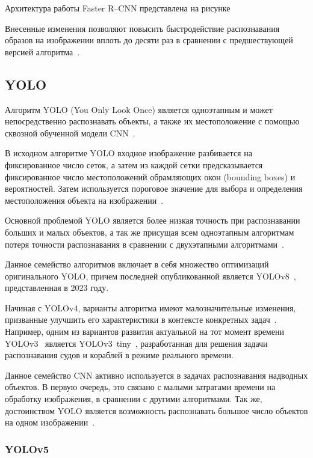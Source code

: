 Архитектура работы Faster R–CNN представлена на рисунке


Внесенные изменения позволяют повысить быстродействие распознавания образов на изображении вплоть до десяти раз в сравнении с предшествующей версией алгоритма~\cite{faster-r-cnn}.

\subsection{YOLO}

Алгоритм YOLO (You Only Look Once) является одноэтапным и может непосредственно распознавать объекты, а также их местоположение с помощью сквозной обученной модели CNN~\cite{yolo-review}.

В исходном алгоритме YOLO входное изображение разбивается на фиксированное число сеток, а затем из каждой сетки предсказывается фиксированное число местоположений обрамляющих окон (bounding boxes) и вероятностей. Затем используется пороговое значение для выбора и определения местоположения объекта на изображении~\cite{yolo-review}.

Основной проблемой YOLO является более низкая точность при распознавании больших и малых объектов, а так же присущая всем одноэтапным алгоритмам потеря точности распознавания в сравнении с двухэтапными алгоритмами~\cite{yolo-review}.

Данное семейство алгоритмов включает в себя множество оптимизаций оригинального YOLO, причем последней опубликованной является YOLOv8~\cite{yolo-review-2023}, представленная в 2023 году.

Начиная с YOLOv4, варианты алгоритма имеют малозначительные изменения, призванные улучшить его характеристики в контексте конкретных задач~\cite{yolov3-ships}. Например, одним из вариантов развития актуальной на тот момент времени YOLOv3~\cite{yolov3} является YOLOv3~tiny~\cite{yolov3-tiny}, разработанная для решения задачи распознавания судов и кораблей в режиме реального времени.

Данное семейство CNN активно используется в задачах распознавания надводных объектов. В первую очередь, это связано с малыми затратами времени на обработку изображения, в сравнении с другими алгоритмами. Так же, достоинством YOLO является возможность распознавать большое число объектов на одном изображении~\cite{yolo9000}.

\subsubsection{YOLOv5}

